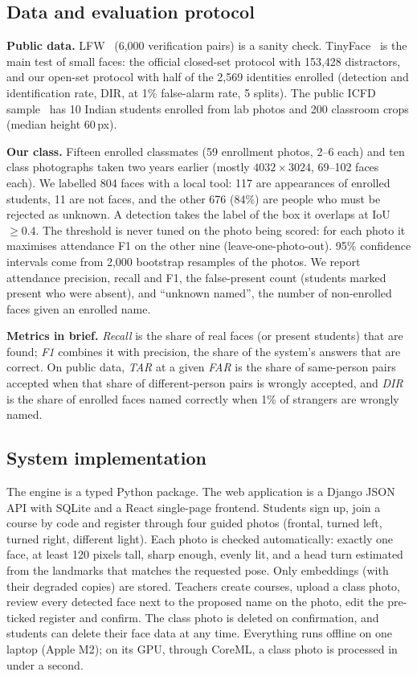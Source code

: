 \documentclass[conference,a4paper]{IEEEtran}
\begin{document}
\subsection{Data and evaluation protocol}
\textbf{Public data.} LFW~\cite{lfw} (6,000 verification pairs) is a sanity check. TinyFace~\cite{tinyface} is the main test of small faces: the official closed-set protocol with 153,428 distractors, and our open-set protocol with half of the 2,569 identities enrolled (detection and identification rate, DIR, at 1\% false-alarm rate, 5 splits). The public ICFD sample~\cite{icfd} has 10 Indian students enrolled from lab photos and 200 classroom crops (median height 60\,px).

\textbf{Our class.} Fifteen enrolled classmates (59 enrollment photos, 2--6 each) and ten class photographs taken two years earlier (mostly $4032\times3024$, 69--102 faces each). We labelled 804 faces with a local tool: 117 are appearances of enrolled students, 11 are not faces, and the other 676 (84\%) are people who must be rejected as unknown. A detection takes the label of the box it overlaps at IoU $\ge 0.4$. The threshold is never tuned on the photo being scored: for each photo it maximises attendance F1 on the other nine (leave-one-photo-out). 95\% confidence intervals come from 2,000 bootstrap resamples of the photos. We report attendance precision, recall and F1, the false-present count (students marked present who were absent), and ``unknown named'', the number of non-enrolled faces given an enrolled name.

\textbf{Metrics in brief.} \emph{Recall} is the share of real faces (or present students) that are found; \emph{F1} combines it with precision, the share of the system's answers that are correct. On public data, \emph{TAR} at a given \emph{FAR} is the share of same-person pairs accepted when that share of different-person pairs is wrongly accepted, and \emph{DIR} is the share of enrolled faces named correctly when 1\% of strangers are wrongly named.

\subsection{System implementation}
The engine is a typed Python package. The web application is a Django JSON API with SQLite and a React single-page frontend. Students sign up, join a course by code and register through four guided photos (frontal, turned left, turned right, different light). Each photo is checked automatically: exactly one face, at least 120 pixels tall, sharp enough, evenly lit, and a head turn estimated from the landmarks that matches the requested pose. Only embeddings (with their degraded copies) are stored. Teachers create courses, upload a class photo, review every detected face next to the proposed name on the photo, edit the pre-ticked register and confirm. The class photo is deleted on confirmation, and students can delete their face data at any time. Everything runs offline on one laptop (Apple M2); on its GPU, through CoreML, a class photo is processed in under a second.
\end{document}
